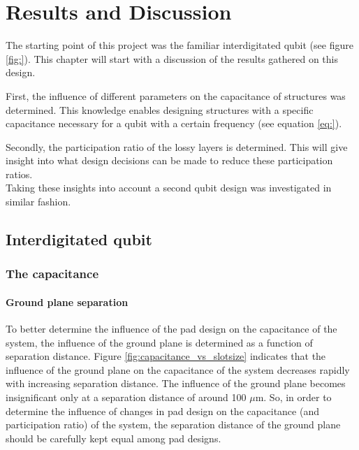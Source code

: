 \chapter{Results and Discussion}
The starting point of this project was the familiar interdigitated qubit (see figure \ref{fig:}). This chapter will start with a discussion of the results gathered on this design.



First, the influence of different parameters on the capacitance of structures was determined. This knowledge enables designing structures with a specific capacitance necessary for a qubit with a certain frequency (see equation \eqref{eq:}).


Secondly, the participation ratio of the lossy layers is determined. This will give insight into what design decisions can be made to reduce these participation ratios.\\
Taking these insights into account a second qubit design was investigated in similar fashion. 





\section{Interdigitated qubit}
\subsection{The capacitance} 
\subsubsection{Ground plane separation}
To better determine the influence of the pad design on the capacitance of the system, the influence of the ground plane is determined as a function of separation distance. Figure \ref{fig:capacitance_vs_slotsize} indicates that the influence of the ground plane on the capacitance of the system decreases rapidly with increasing separation distance. The influence of the ground plane becomes insignificant only at a separation distance of around 100 \(\mu\)m. So, in order to determine the influence of changes in pad design on the capacitance (and participation ratio) of the system, the separation distance of the ground plane should be carefully kept equal among pad designs.  

